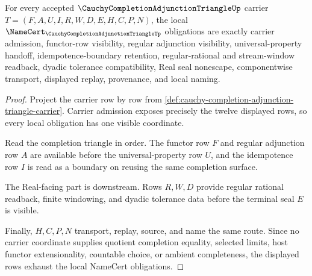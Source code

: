 \begin{theorem}
\label{thm:cauchy-completion-adjunction-triangle-namecert-obligations}
For every accepted $\CauchyCompletionAdjunctionTriangleUp$ carrier $T=(F,A,U,I,R,W,D,E,H,C,P,N)$, the local $\NameCert_{\CauchyCompletionAdjunctionTriangleUp}$ obligations are exactly carrier admission, functor-row visibility, regular adjunction visibility, universal-property handoff, idempotence-boundary retention, regular-rational and stream-window readback, dyadic tolerance compatibility, Real seal nonescape, componentwise transport, displayed replay, provenance, and local naming.
\end{theorem}
\begin{proof}
Project the carrier row by row from \autoref{def:cauchy-completion-adjunction-triangle-carrier}. Carrier admission exposes precisely the twelve displayed rows, so every local obligation has one visible coordinate.

Read the completion triangle in order. The functor row $F$ and regular adjunction row $A$ are available before the universal-property row $U$, and the idempotence row $I$ is read as a boundary on reusing the same completion surface.

The Real-facing part is downstream. Rows $R,W,D$ provide regular rational readback, finite windowing, and dyadic tolerance data before the terminal seal $E$ is visible.

Finally, $H,C,P,N$ transport, replay, source, and name the same route. Since no carrier coordinate supplies quotient completion equality, selected limits, host functor extensionality, countable choice, or ambient completeness, the displayed rows exhaust the local NameCert obligations.
\end{proof}

